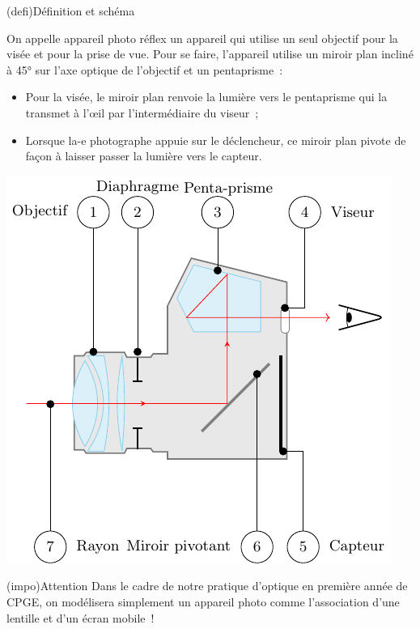 \documentclass[../../main/main.tex]{subfiles}
\begin{document}
\begin{tcb}[sidebyside, righthand ratio=.4](defi){Définition et schéma}

	On appelle appareil photo réflex un appareil qui utilise un seul objectif pour
	la visée et pour la prise de vue. Pour se faire, l'appareil utilise un miroir
	plan incliné à \ang{45;;} sur l'axe optique de l'objectif et un pentaprisme~:

	\begin{itemize}[label=$\diamond$, leftmargin=10pt]
		\item Pour la visée, le miroir plan renvoie la lumière vers le pentaprisme
		      qui la transmet à l'œil par l'intermédiaire du viseur~;
		\item Lorsque la-e photographe appuie sur le déclencheur, ce miroir plan
		      pivote de façon à laisser passer la lumière vers le capteur.
	\end{itemize}
	\tcblower
	\begin{center}
		\includegraphics[width=\linewidth]{reflex}
	\end{center}
\end{tcb}

\begin{tcb}[fontupper=\Large](impo){Attention}
	Dans le cadre de notre pratique d'optique en première année de CPGE, on
	modélisera simplement un appareil photo comme l'association d'une lentille et
	d'un écran mobile~!
\end{tcb}
\end{document}
